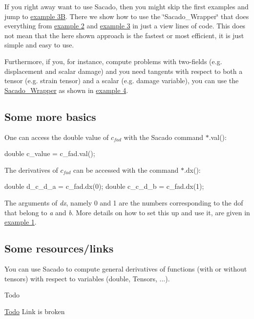If you right away want to use Sacado, then you might skip the first examples and jump to \hyperlink{index_Ex3B}{example 3B}. There we show how to use the \char`\"{}\+Sacado\+\_\+\+Wrapper\char`\"{} that does everything from \hyperlink{index_Ex2}{example 2} and \hyperlink{index_Ex3}{example 3} in just a view lines of code. This does not mean that the here shown approach is the fastest or most efficient, it is just simple and easy to use.

Furthermore, if you, for instance, compute problems with two-\/fields (e.\+g. displacement and scalar damage) and you need tangents with respect to both a tensor (e.\+g. strain tensor) and a scalar (e.\+g. damage variable), you can use the \hyperlink{namespaceSacado__Wrapper}{Sacado\+\_\+\+Wrapper} as shown in \hyperlink{index_Ex4}{example 4}.\hypertarget{index_subsec_more_basics}{}\subsection{Some more basics}\label{index_subsec_more_basics}
One can access the double value of $ c_{fad} $ with the Sacado command $\ast$.val()\+: 
\begin{DoxyCode}
\textcolor{keywordtype}{double} c\_value = c\_fad.val();
\end{DoxyCode}
 The derivatives of $ c_{fad} $ can be accessed with the command $\ast$.dx()\+: 
\begin{DoxyCode}
\textcolor{keywordtype}{double} d\_c\_d\_a = c\_fad.dx(0);
\textcolor{keywordtype}{double} c\_c\_d\_b = c\_fad.dx(1);
\end{DoxyCode}
 The arguments of {\itshape dx}, namely 0 and 1 are the numbers corresponding to the dof that belong to {\itshape a} and {\itshape b}. More details on how to set this up and use it, are given in \hyperlink{index_Ex1}{example 1}.\hypertarget{index_subsec_resources}{}\subsection{Some resources/links}\label{index_subsec_resources}
You can use Sacado to compute general derivatives of functions (with or without tensors) with respect to variables (double, Tensors, ...). \begin{DoxyRefDesc}{Todo}
\item[\hyperlink{todo__todo000002}{Todo}]Link is broken\end{DoxyRefDesc}



